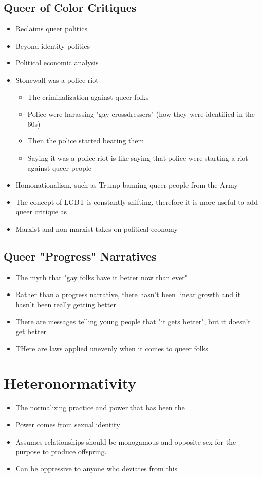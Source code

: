 \documentclass{article}
\begin{document}
\subsection{Queer of Color Critiques}
\begin{itemize}
  \item Reclaims queer politics
  \item Beyond identity politics
  \item Political economic analysis
  \item Stonewall was a police riot
    \begin{itemize}
      \item The criminalization against queer folks
      \item Police were harassing "gay crossdressers" (how they were identified in the 60s)
      \item Then the police started beating them
      \item Saying it was a police riot is like saying that police were starting
        a riot against queer people
    \end{itemize}
  \item Homonationalism, such as Trump banning queer people from the Army
  \item The concept of LGBT is constantly shifting, therefore
    it is more useful to add queer critique as
  \item Marxist and non-marxist takes on political economy
\end{itemize}

\subsection{Queer "Progress" Narratives}
\begin{itemize}
  \item The myth that "gay folks have it better
    now than ever"
  \item Rather than a progress narrative, there hasn't been linear
    growth and it hasn't been really getting better
  \item There are messages telling young people that "it gets better",
    but it doesn't get better
  \item THere are laws applied unevenly when it comes to queer folks
\end{itemize}

\section{Heteronormativity}
\begin{itemize}
  \item The normalizing practice and power that has been the 
  \item Power comes from sexual identity
  \item Assumes relationships should be monogamous and opposite sex
    for the purpose to produce offspring.
  \item Can be oppressive to anyone who deviates from this
\end{itemize}
\end{document}
